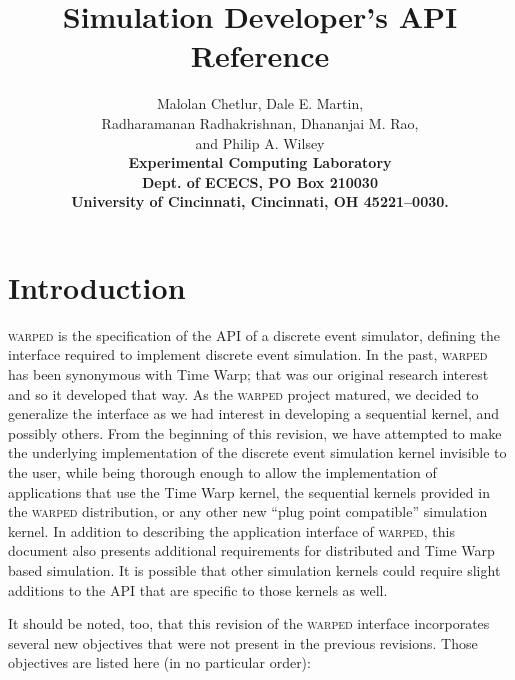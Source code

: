 \documentclass[11pt]{article}
\begin{document}
\title{\textbf{Simulation Developer's API Reference}} 

\author{ 
\textsf{Malolan Chetlur, Dale E. Martin,}\\ 
\textsf{Radharamanan Radhakrishnan, Dhananjai M. Rao,}\\ 
\textsf{and Philip A. Wilsey} \\
\textbf{Experimental Computing Laboratory} \\
\textbf{Dept. of ECECS, PO Box 210030} \\
\textbf{University of Cincinnati, Cincinnati, OH 45221--0030.}
}

\date{ }

\maketitle

\section{Introduction}

\textsc{warped} is the specification of the API of a discrete event simulator,
defining the interface required to implement discrete event simulation.
In the past, \textsc{warped} has been synonymous with Time Warp; that was
our original research interest and so it developed that way.  As the
\textsc{warped} project matured, we decided to generalize the interface
as we had interest in developing a sequential kernel, and possibly others.
From the beginning of this revision, we have attempted to make the
underlying implementation of the discrete event simulation kernel
invisible to the user, while being thorough enough to allow the
implementation of applications that use the Time Warp kernel, the
sequential kernels provided in the \textsc{warped} distribution, or any
other new ``plug point compatible'' simulation kernel. In addition to
describing the application interface of \textsc{warped}, this document
also presents additional requirements for distributed and Time Warp based
simulation.  It is possible that other simulation kernels could require
slight additions to the API that are specific to those kernels as well.

It should be noted, too, that this revision of the \textsc{warped} interface
incorporates several new objectives that were not present in the previous
revisions.  Those objectives are listed here (in no particular order):
\end{document}
